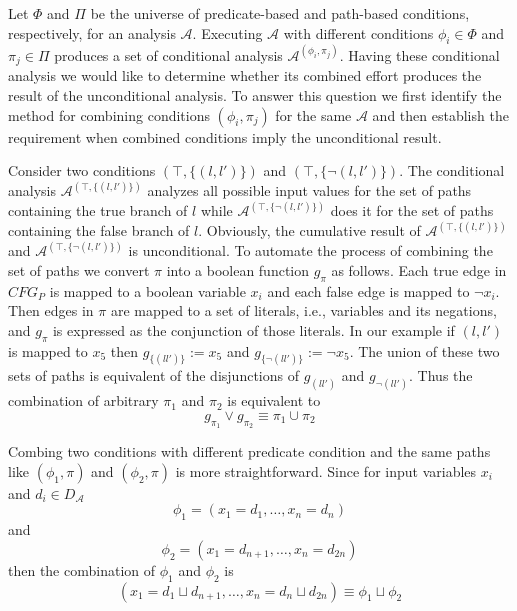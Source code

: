 Let $\Phi$ and $\Pi$ be the universe of predicate-based and path-based conditions, respectively, for an analysis $\mathcal{A}$. Executing $\mathcal{A}$ with different conditions $\phi_i\in \Phi$ and $\pi_j\in\Pi$ produces a set of conditional analysis $\mathcal{A}^{(\phi_i,\pi_j)}$. Having these conditional analysis we would like to determine whether its combined effort produces the result of the unconditional analysis. To answer this question we first identify the method for combining conditions $(\phi_i,\pi_j)$ for the same $\mathcal{A}$ and then establish the requirement when combined conditions imply the unconditional result.

Consider two conditions $(\top,\{(l,l')\})$ and $(\top,\{\neg(l,l')\})$. The conditional analysis $\mathcal{A}^{(\top,\{(l,l')\})}$ analyzes all possible input values for the set of paths containing the true branch of $l$ while $\mathcal{A}^{(\top,\{\neg(l,l')\})}$ does it for the set of paths containing the false branch of $l$. Obviously, the cumulative result of $\mathcal{A}^{(\top,\{(l,l')\})}$ and $\mathcal{A}^{(\top,\{\neg(l,l')\})}$ is unconditional. To automate the process of combining the set of paths we convert $\pi$ into a boolean function $g_\pi$ as follows.  Each true edge in $CFG_P$ is mapped to a boolean variable $x_i$ and each false edge is mapped to $\neg x_i$. Then edges in $\pi$ are mapped to a set of literals, i.e., variables and its negations, and $g_\pi$ is expressed as the conjunction of those literals. In our example if $(l,l')$ is mapped to $x_5$ then $g_{\{(ll')\}} := x_5$ and $g_{\{\neg(ll')\}} := \neg x_5$. The union of these two sets of paths is equivalent of the disjunctions of $g_{(ll')}$ and $g_{\neg(ll')}$. Thus the combination of arbitrary $\pi_1$ and $\pi_2$ is equivalent to 
$$
g_{\pi_1}\lor g_{\pi_2} \equiv \pi_1 \cup \pi_2 
$$

Combing two conditions with different predicate condition and the same paths like $(\phi_1, \pi)$ and $(\phi_2, \pi)$ is more straightforward. Since for input variables $x_i$ and $d_i\in D_{\mathcal{A}}$ 
$$\phi_1=(x_1=d_1,\dots, x_n=d_n)$$ and 
$$\phi_2=(x_1=d_{n+1},\dots, x_n=d_{2n})$$ 
then the combination of $\phi_1$ and $\phi_2$ is 
$$(x_1=d_1\sqcup d_{n+1},\dots, x_n=d_n\sqcup d_{2n}) \equiv \phi_1\sqcup \phi_2$$

